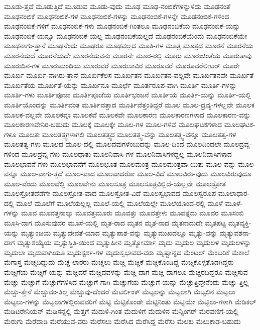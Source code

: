 {ಮೂಡು-ತ್ತವೆ
ಮೂಡುತ್ತಿದೆ
ಮೂಡುವ
ಮೂಡು-ವುದು
ಮೂಢ
ಮೂಢ-ನಂಬಿಕೆಗಳನ್ನುಳಿದು
ಮೂಢನಂತೆ
ಮೂಢನಂಬಿಕೆ
ಮೂಢನಂಬಿಕೆ-ಗಳ
ಮೂಢನಂಬಿಕೆ-ಗಳನ್ನು
ಮೂಢನಂಬಿಕೆ-ಗಳನ್ನೇ
ಮೂಢನಂಬಿಕೆ-ಗಳಿಂದ
ಮೂಢನಂಬಿಕೆ-ಗಳಿಗೆ
ಮೂಢನಂಬಿಕೆ-ಗಳು
ಮೂಢನಂಬಿಕೆ-ಗಿಂತಲೂ
ಮೂಢನಂಬಿಕೆಯ
ಮೂಢನಂಬಿಕೆ-ಯನ್ನು
ಮೂಢನಂಬಿಕೆ-ಯನ್ನೂ
ಮೂಢನಂಬಿಕೆ-ಯಲ್ಲ
ಮೂಢನಂಬಿಕೆಯಲ್ಲದೆ
ಮೂಢನಂಬಿಕೆಯೆಂದು
ಮೂಢನಂಬಿಕೆಯೇ
ಮೂಢನಾಗು-ತ್ತಾನೆ
ಮೂಢನೆಂದು
ಮೂಢರೂ
ಮೂಢವಲ್ಲದ
ಮೂತಿ-ಗಳ
ಮೂತ್ರ
ಮೂತ್ರದ
ಮೂರನೆ
ಮೂರನೆಯ
ಮೂರನೆಯದೆ
ಮೂರನೆಯದೇ
ಮೂರನೆಯವನು
ಮೂರನೇ
ಮೂರ-ರಲ್ಲಿ
ಮೂರು
ಮೂರುಚಿಂತೆಯ
ಮೂರುತಾವು
ಮೂರುದಿನ-ಗಳ
ಮೂರುಮಂದಿಯ
ಮೂರುವರೆ
ಮೂರುಸಾವಿರ
ಮೂರೂವರೆ
ಮೂರೂವರೆಲೀಟರ್
ಮೂರೇ
ಮೂರ್ಖ
ಮೂರ್ಖ-ನಾಗಿರು-ತ್ತಾನೆ
ಮೂರ್ಖಕೆಲಸ
ಮೂರ್ಖತನ
ಮೂರ್ಖತನ-ವಲ್ಲವೇ
ಮೂರ್ಖತನವೇ
ಮೂರ್ಖತೆ
ಮೂರ್ಖತೆಯ
ಮೂರ್ಖತೆ-ಯನ್ನು
ಮೂರ್ಖನೂ
ಮೂರ್ಛೆ
ಮೂರ್ತರೂಪ-ವಾಗಿ
ಮೂರ್ತಿ
ಮೂರ್ತಿ-ಗಳನ್ನು
ಮೂರ್ತಿ-ಗಳು
ಮೂರ್ತಿಪೂಜಾ
ಮೂರ್ತಿಪೂಜೆಯ
ಮೂರ್ತಿಭಂಜನೆ
ಮೂರ್ತಿಯ
ಮೂರ್ತಿ-ಯನ್ನು
ಮೂರ್ತಿ-ಯಲ್ಲಿ
ಮೂರ್ತಿಯೊಂದನ್ನು
ಮೂರ್ತಿವಂತ
ಮೂರ್ತಿವತ್ತಾದ
ಮೂರ್ತಿವೆತ್ತಂತಿದ್ದರೆ
ಮೂಲ
ಮೂಲ-ದ್ರವ್ಯ-ಗಳಲ್ಲವೇ
ಮೂಲಕ
ಮೂಲಕ-ವಲ್ಲವೇ
ಮೂಲಕವೂ
ಮೂಲಕವೆ
ಮೂಲಕವೇ
ಮೂಲಕಾರಣ
ಮೂಲಕಾರಣಗಳಾದ
ಮೂಲಕಾರಣ-ವನ್ನು
ಮೂಲಕಾರಣವೇನಿರ-ಬಹುದು
ಮೂಲಕ್ಕೆ
ಮೂಲಕ್ಕೇ
ಮೂಲ-ಗಳ
ಮೂಲ-ಗಳಿವೆ
ಮೂಲಘಟಕಗಳಾದ
ಮೂಲಘಟಕ-ಗಳೂ
ಮೂಲತಃ
ಮೂಲತತ್ತ್ವಗಳಾಗಲಿ
ಮೂಲತತ್ತ್ವದ
ಮೂಲತತ್ತ್ವ-ವನ್ನು
ಮೂಲತತ್ತ್ವ-ವನ್ನೂ
ಮೂಲತತ್ವ-ಗಳ
ಮೂಲತತ್ವ-ಗಳು
ಮೂಲದ
ಮೂಲ-ದಲ್ಲಿ
ಮೂಲದವುಗಳೆಂಬುದನ್ನು
ಮೂಲ-ದಿಂದ
ಮೂಲದಿಂದಲೇ
ಮೂಲದ್ರವ್ಯ-ಗಳಿಂದ
ಮೂಲದ್ರವ್ಯ-ಗಳು
ಮೂಲಧಾತು
ಮೂಲನಿವಾಸಿ-ಗಳ
ಮೂಲನಿವಾಸಿಗಳದ್ದಲ್ಲ
ಮೂಲನಿವಾಸಿಗಳಾದ
ಮೂಲಭಾವನೆ-ಗಳು
ಮೂಲಭಾವನೆಗೆ
ಮೂಲಭೂತ
ಮೂಲಮಂತ್ರ
ಮೂಲಮಂತ್ರವಾ-ಯಿತು
ಮೂಲ-ವನ್ನು
ಮೂಲ-ವನ್ನೂ
ಮೂಲ-ವಾಗು-ತ್ತದೆ
ಮೂಲ-ವಾದ
ಮೂಲವಾದರೋ
ಮೂಲ-ವಿದೆ
ಮೂಲವಿರು-ವುದು
ಮೂಲವಿರುವುದೂ
ಮೂಲ-ವೆಂದು
ಮೂಲವೆಲ್ಲಿ
ಮೂಲವೇನು
ಮೂಲಸೂತ್ರ
ಮೂಲಸೂತ್ರವಿಲ್ಲಿದೆ-ಯಲ್ಲವೇ
ಮೂಲಸ್ರೋತ
ಮೂಲಸ್ರೋತದೆಡೆಗೇ
ಮೂಲಸ್ರೋತ-ವಾದ
ಮೂಲಸ್ರೋತ-ವಿದೆ
ಮೂಲಸ್ವಭಾವದ
ಮೂಲಸ್ವರೂಪ
ಮೂಲಾಧಾರ-ದಲ್ಲಿ
ಮೂಲೆ
ಮೂಲೆಗೆ
ಮೂಲೆಯಲ್ಲಲ್ಲ
ಮೂಲೆ-ಯಲ್ಲಿ
ಮೂಲೆಯಲ್ಲೇ
ಮೂಲೆಯೊಂದ-ರಲ್ಲಿ
ಮೂಳೆ
ಮೂಳೆ-ಗಳನ್ನು
ಮೂವ
ಮೂವತ್ತನಾಲ್ಕು
ಮೂವತ್ತಮೂರು
ಮೂವತ್ತು
ಮೂವತ್ತೇಳು
ಮೂವತ್ತೈದು
ಮೂವರ
ಮೂಸಂಬಿ
ಮೂಸಿ-ದಾಗ
ಮೂಸುವುದರ
ಮೂಸೆ-ಯಲ್ಲಿ
ಮೃತ-ರಾದ
ಮೃತನ
ಮೃತ-ನಾದ
ಮೃತನಾದುದೇ
ಮೃತಪಟ್ಟ
ಮೃತವ್ಯಕ್ತಿ-ಯನ್ನು
ಮೃತ್ಯುಂಜಯ
ಮೃತ್ಯುದೇವತೆ-ಯಾದ
ಮೃತ್ಯುಪಾಶ-ವನ್ನು
ಮೃತ್ಯುಮುಖದಲ್ಲೂ
ಮೃತ್ಯು-ವನ್ನು
ಮೃತ್ಯುವಶನಾ-ದಾಗ
ಮೃತ್ಯುಶಯ್ಯೆಯ
ಮೃತ್ಯುಸ್ಥಿತಿ-ಯಿಂದ
ಮೃತ್ಯುಹೀನ
ಮೃತ್ಯೋರ್ಮಾ
ಮೃದು
ಮೃದುಲ
ಮೃದುಲಳ
ಮೃದುಲಳನ್ನು
ಮೃದುಲಾ
ಮೃದುವಾಗಿಯೂ
ಮೃದುಸ್ಪರ್ಶ-ಗಳ
ಮೃದುಸ್ವಭಾವದ-ವರು
ಮೃಷ್ಟಾನ್ನದ
ಮೆಂಟಲ್
ಮೆಂಬರಿಕೆ
ಮೆಕಾಲೆ
ಮೆಗಾಸ್ತ
ಮೆಚ್ಚದಿದ್ದುದು
ಮೆಚ್ಚ-ಲಾರರು
ಮೆಚ್ಚಲು
ಮೆಚ್ಚಿ
ಮೆಚ್ಚಿಕೆ
ಮೆಚ್ಚಿಕೊಂಡಿದ್ದ
ಮೆಚ್ಚಿಕೊಳ್ಳತೊಡಗಿದ್ದರು
ಮೆಚ್ಚಿಗೆಯ
ಮೆಚ್ಚಿಗೆ-ಯನ್ನು
ಮೆಚ್ಚಿದರೆ
ಮೆಚ್ಚಿದವಳನ್ನು
ಮೆಚ್ಚಿ-ದಾಗ
ಮೆಚ್ಚಿ-ದಾಗಲೂ
ಮೆಚ್ಚಿರದಿದ್ದರೂ
ಮೆಚ್ಚಿಸುವ
ಮೆಚ್ಚು
ಮೆಚ್ಚುಗೆ
ಮೆಚ್ಚುಗೆಗಳಿಸಿದ
ಮೆಚ್ಚುಗೆ-ಗಾಗಿ
ಮೆಚ್ಚುಗೆಯ
ಮೆಚ್ಚುಗೆ-ಯನ್ನು
ಮೆಚ್ಚುತ್ತಿದ್ದೇನೆಂದು
ಮೆಚ್ಚು-ತ್ತಿಲ್ಲ
ಮೆಚ್ಚು-ತ್ತೇನೆ
ಮೆಚ್ಚುವಂ-ತಿಲ್ಲ
ಮೆಚ್ಚುವು-ದೆಂದರೆ
ಮೆಟರ್ಲಿಂಕ್
ಮೆಟ್ಟಲನ್ನು
ಮೆಟ್ಟಲಾಗಿ
ಮೆಟ್ಟಲಿನ
ಮೆಟ್ಟಲು
ಮೆಟ್ಟಲು-ಗಳನ್ನು
ಮೆಟ್ಟಲುಗಳಲ್ಲಿರುವವರಿಗೆ
ಮೆಟ್ಟಿ
ಮೆಟ್ಟಿಕೊಂಡೇ
ಮೆಟ್ಟಿನಿಂತು
ಮೆಟ್ಟಿಯೇ
ಮೆಟ್ಟಿಲು-ಗಳಾಗಿ
ಮೆಡಿಕಲ್
ಮೆಡಿಟರೇನಿಯನ್
ಮೆಡಿಸನ್ನಲ್ಲಿ
ಮೆತ್ತಗೆ
ಮೆದುಳಿ-ಗಿಂತ
ಮೆದುಳಿಗೆ
ಮೆದುಳಿನ
ಮೆನ್ನಿಂಗರ್
ಮೆರವಣಿಗೆ-ಯಲ್ಲಿ
ಮೆರುಗು
ಮೆರೆದಾಡಿ
ಮೆರೆಯುವ-ವರು
ಮೆರೆಸಲು
ಮೆರೆಸಿದ
ಮೆರೆಸಿದ್ದ
ಮೆರೆಸು
ಮೆಲಕು
ಮೆಲುಕಾಡ-ಬಹುದು
}
